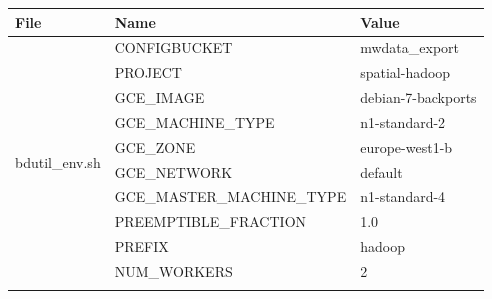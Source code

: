 \documentclass[a4paper,12pt,oneside]{report}
\begin{document}
	\begin{table}[!htbp]
		\centering
		\begin{scriptsize}
			\begin{tabular}{@{}lll@{}}
				\toprule
				\multicolumn{1}{|l|}{File}                        & \multicolumn{1}{l|}{Name}   
				& \multicolumn{1}{l|}{Value}              \\ \midrule
				\midrule
				\multicolumn{1}{|l|}{\multirow{17}{*}{bdutil\_env.sh}} &
				\multicolumn{1}{l|}{CONFIGBUCKET}                 &
				\multicolumn{1}{l|}{mwdata\_export}     \\ \cmidrule(l){2-3} 
				\multicolumn{1}{|l|}{}                                 &
				\multicolumn{1}{l|}{PROJECT}                      &
				\multicolumn{1}{l|}{spatial-hadoop}     \\ \cmidrule(l){2-3} 
				\multicolumn{1}{|l|}{}                                 &
				\multicolumn{1}{l|}{GCE\_IMAGE}                   &
				\multicolumn{1}{l|}{debian-7-backports} \\ \cmidrule(l){2-3} 
				\multicolumn{1}{|l|}{}                                 &
				\multicolumn{1}{l|}{GCE\_MACHINE\_TYPE}           &
				\multicolumn{1}{l|}{n1-standard-2}      \\ \cmidrule(l){2-3} 
				\multicolumn{1}{|l|}{}                                 &
				\multicolumn{1}{l|}{GCE\_ZONE}                    &
				\multicolumn{1}{l|}{europe-west1-b}     \\ \cmidrule(l){2-3} 
				\multicolumn{1}{|l|}{}                                 &
				\multicolumn{1}{l|}{GCE\_NETWORK}                 & \multicolumn{1}{l|}{default}
				\\ \cmidrule(l){2-3} 
				\multicolumn{1}{|l|}{}                                 &
				\multicolumn{1}{l|}{GCE\_MASTER\_MACHINE\_TYPE}   &
				\multicolumn{1}{l|}{n1-standard-4}      \\ \cmidrule(l){2-3} 
				\multicolumn{1}{|l|}{}                                 &
				\multicolumn{1}{l|}{PREEMPTIBLE\_FRACTION}        & \multicolumn{1}{l|}{1.0}    
				\\ \cmidrule(l){2-3} 
				\multicolumn{1}{|l|}{}                                 &
				\multicolumn{1}{l|}{PREFIX}                       & \multicolumn{1}{l|}{hadoop} 
				\\ \cmidrule(l){2-3} 
				\multicolumn{1}{|l|}{}                                 &
				\multicolumn{1}{l|}{NUM\_WORKERS}                 & \multicolumn{1}{l|}{2}      
				\\ \cmidrule(l){2-3} 

\end{tabular}
\end{scriptsize}
\end{table}
\end{document}
